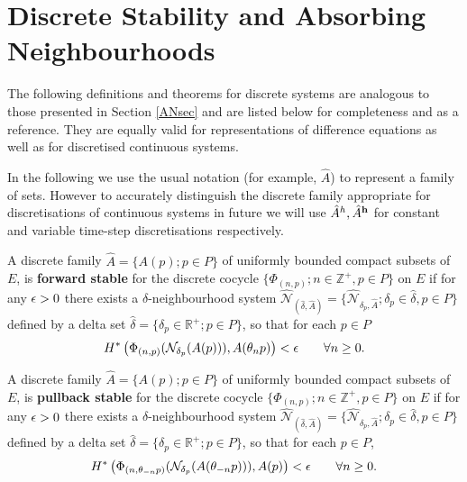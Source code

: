 \section{Discrete Stability and Absorbing Neighbourhoods}

The following definitions and theorems for discrete systems are analogous to those presented
in Section \ref{ANsec} and are listed below for completeness and as a reference.
They are equally valid for representations of difference equations as well as
for discretised continuous systems.

In the following we use the usual notation (for example, $\hat{A}$) to
represent a family of sets. However to accurately distinguish the discrete
family appropriate for discretisations of continuous systems in future we will
use $\hat{A}^h, \hat{A}^{\bf h}$ for constant and variable time-step
discretisations respectively.

\begin{defn} \label{DFSdef}
   A discrete family $\hat{A} = \{A(p);p \in P\}$ of
   uniformly bounded compact subsets of $E$, is {\bf
   forward stable} for the discrete cocycle
   $\{\Phi_{(n, p)}; n \in \mathbb{Z}^{+}, p \in P\}$ on $E$
   if for any $\epsilon > 0$ there exists a
   $\delta$-neighbourhood system
   $\hat{\mathcal{N}}_{(\hat{\delta} ,\hat{A})} =
   \{\hat{\mathcal{N}}_{\delta_p, \hat{A}}; \delta_p \in \hat{\delta}, p \in P
   \}$ defined by a delta set $\hat{\delta} = \{\delta_p \in \mathbb{R}^+; p
   \in P\}$, so that for each $p \in P$
   \[ H^* \left(\Phi_{(n, p)}
           (\mathcal{N}_{\delta_p}(A(p))), A(\theta_n p) \right) < \epsilon \qquad
           \forall n \geq 0. \]
\end{defn}

\begin{defn} \label{DPSdef}
   A discrete family $\hat{A} = \{A(p);p \in P\}$ of
   uniformly bounded compact subsets of $E$, is {\bf
   pullback stable} for the discrete cocycle
   $\{\Phi_{(n, p)}; n \in \mathbb{Z}^{+}, p \in P\}$ on $E$
   if for any $\epsilon > 0$ there exists a
   $\delta$-neighbourhood system
   $\hat{\mathcal{N}}_{(\hat{\delta} ,\hat{A})} =
   \{\hat{\mathcal{N}}_{\delta_p, \hat{A}}; \delta_p \in \hat{\delta}, p \in P
   \}$ defined by a delta set $\hat{\delta} = \{\delta_p \in \mathbb{R}^+; p
   \in P\}$, so that for each $p \in P$,
   \[ H^* \left(\Phi_{(n, \theta_{-n}p)}
           (\mathcal{N}_{\delta_p}(A(\theta_{-n} p))), A(p) \right) < \epsilon \qquad
           \forall n \geq 0. \]
\end{defn}


